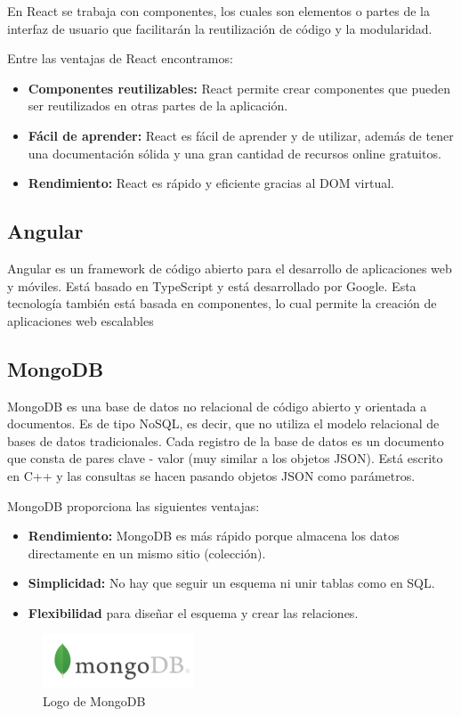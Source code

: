 En React se trabaja con componentes, los cuales son elementos o partes de la interfaz de usuario que facilitarán la reutilización de código y la modularidad.

Entre las ventajas de React encontramos:
\begin{itemize}
\item \textbf{Componentes reutilizables:} React permite crear componentes que pueden ser reutilizados en otras partes de la aplicación.
\item \textbf{Fácil de aprender:} React es fácil de aprender y de utilizar, además de tener una documentación sólida y una gran cantidad de recursos online gratuitos.
\item \textbf{Rendimiento:} React es rápido y eficiente gracias al DOM virtual.
\end{itemize}

\subsection{Angular}
Angular es un framework de código abierto para el desarrollo de aplicaciones web y móviles. Está basado en TypeScript y está desarrollado por Google.
Esta tecnología también está basada en componentes, lo cual permite la creación de aplicaciones web escalables

\subsection{MongoDB}
MongoDB es una base de datos no relacional de código abierto y orientada a documentos. 
Es de tipo NoSQL, es decir, que no utiliza el modelo relacional de bases de datos tradicionales.
Cada registro de la base de datos es un documento que consta de pares clave - valor (muy similar a los objetos JSON).
Está escrito en C++ y las consultas se hacen pasando objetos JSON como parámetros.

MongoDB proporciona las siguientes ventajas:
\begin{itemize}
\item \textbf{Rendimiento:} MongoDB es más rápido porque almacena los datos directamente en un mismo sitio (colección).
\item \textbf{Simplicidad:} No hay que seguir un esquema ni unir tablas como en SQL.
\item  \textbf{Flexibilidad} para diseñar el esquema y crear las relaciones.
\end{itemize}
\begin{figure}[H]
    \centering
    \includegraphics[width=0.4\textwidth]{imagenes/c2/mongodb.png}
    \caption{Logo de MongoDB}
\end{figure}

